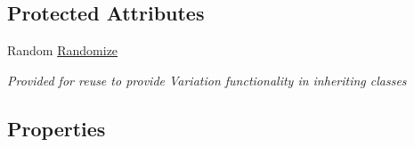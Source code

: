 \subsection*{Protected Attributes}
\begin{DoxyCompactItemize}
\item 
Random \hyperlink{class_farseer_physics_1_1_controllers_1_1_abstract_force_controller_a2e7ac49604ba54d24dd593aaa5b80e59}{Randomize}
\begin{DoxyCompactList}\small\item\em Provided for reuse to provide Variation functionality in inheriting classes \end{DoxyCompactList}\end{DoxyCompactItemize}
\subsection*{Properties}
